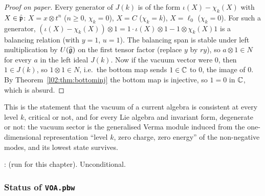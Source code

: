 \begin{proof}[Proof on paper]
Every generator of $J(k)$ is of the form $\iota(X) - \chi_k(X)$ with $X\in\hat{\mathfrak{p}}$: $X = x\otimes t^n$
($n\ge0$, $\chi_k = 0$), $X = C$ ($\chi_k = k$), $X = \ell_0$ ($\chi_k = 0$). For such a generator,
$(\iota(X) - \chi_k(X))\otimes1 = 1\cdot\iota(X)\otimes1 - 1\otimes\chi_k(X)1$ is a balancing relation (with
$y = 1$, $u = 1$). The balancing span is stable under left multiplication by $U(\widehat{\mathfrak{g}})$ on the first
tensor factor (replace $y$ by $ry$), so $a\otimes1\in N$ for every $a$ in the left ideal $J(k)$. Now if the
vacuum vector were $0$, then $1\in J(k)$, so $1\otimes1\in N$, i.e.\ the bottom map sends $1\in{\mathbb{C}}$ to $0$, the
image of $0$. By Theorem~\ref{l02:thm:bottominj} the bottom map is injective, so $1 = 0$ in ${\mathbb{C}}$, which is
absurd.
\end{proof}

\begin{physics}
This is the statement that the vacuum of a current algebra is consistent at every level $k$, critical
or not, and for every Lie algebra and invariant form, degenerate or not: the vacuum sector is the
generalised Verma module induced from the one-dimensional representation ``level $k$, zero charge, zero
energy'' of the non-negative modes, and its lowest state survives.
\end{physics}

\begin{status}
\allowbreak{}\allowbreak{}\allowbreak{}\allowbreak{}\allowbreak{}\allowbreak{}:  (run for
this chapter). Unconditional.
\end{status}

\subsubsection{Status of \texorpdfstring{\texttt{VOA.pbw}}{VOA.pbw}}

